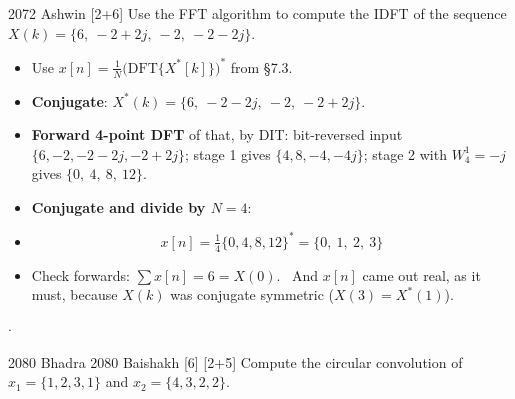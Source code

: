 {\color{sub}\footnotesize {} }

\begin{asked}{2072 Ashwin \textperiodcentered{} [2+6]}
Use the FFT algorithm to compute the IDFT of the sequence
$X(k)=\{6,\ -2+2j,\ -2,\ -2-2j\}$.
\end{asked}
\begin{itemize}
  \item Use $x[n]=\frac1N\big(\mathrm{DFT}\{X^*[k]\}\big)^*$ from \S7.3.
  \item \textbf{Conjugate}: $X^*(k)=\{6,\ -2-2j,\ -2,\ -2+2j\}$.
  \item \textbf{Forward 4-point DFT} of that, by DIT: bit-reversed input
        $\{6,-2,-2-2j,-2+2j\}$; stage 1 gives $\{4,8,-4,-4j\}$; stage 2 with
        $W_4^1=-j$ gives $\{0,\ 4,\ 8,\ 12\}$.
  \item \textbf{Conjugate and divide by $N=4$}:
  \item[] \[ \boxed{x[n]=\tfrac14\{0,4,8,12\}^{*}=\{0,\ 1,\ 2,\ 3\}} \]
  \item Check forwards: $\sum x[n]=6=X(0)$. \checkmark\ And $x[n]$ came out real, as it
        must, because $X(k)$ was conjugate symmetric ($X(3)=X^*(1)$).
\end{itemize}

\hr

{\color{sub}\footnotesize {} 
\gap$\cdot$\gap {}}

\begin{asked}{2080 Bhadra \textperiodcentered{} 2080 Baishakh \textperiodcentered{} [6] [2+5]}
Compute the circular convolution of $x_1=\{1,2,3,1\}$ and $x_2=\{4,3,2,2\}$.
\end{asked}

